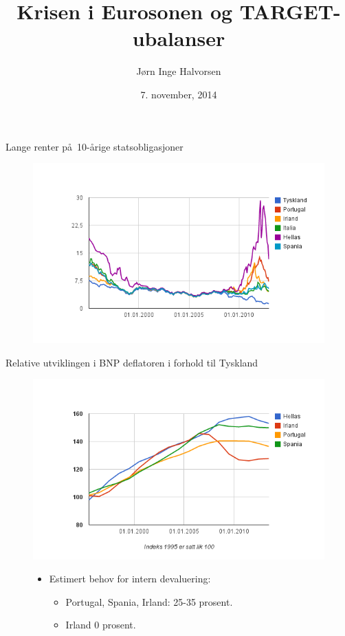\documentclass[notes=show notes]{beamer}
\begin{document}
\author[]{J\o rn Inge Halvorsen }
\title[]{Krisen i Eurosonen og TARGET-ubalanser}
\date[]{7. november, 2014}
\maketitle
\begin{frame}{Lange renter p\aa \  10-\aa rige statsobligasjoner}
\begin{figure}
\centering
\includegraphics[width=0.9\linewidth]{Fig2_Lange_Renter_G}
\label{fig:Fig2_Lange_Renter_G}
\end{figure}
\end{frame}
\begin{frame}{Relative utviklingen i BNP deflatoren i forhold til Tyskland}
\begin{figure}
\centering
\includegraphics[width=0.80\linewidth]{Fig3_bnp_deflator_g}
\begin{itemize}
\item Estimert behov for intern devaluering:
\begin{itemize}
	\item Portugal, Spania, Irland: 25-35 prosent.
	\item Irland 0 prosent.
\end{itemize}
\end{itemize}
\label{fig:Fig3_bnp_deflator_g}
\end{figure}
\end{frame}
\end{document}
